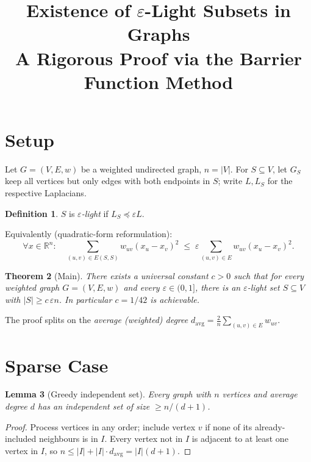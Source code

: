 \documentclass[12pt]{article}
\title{Existence of $\varepsilon$-Light Subsets in Graphs\\[4pt]
\large A Rigorous Proof via the Barrier Function Method}
\author{}
\date{}
\newtheorem{theorem}{Theorem}
\newtheorem{lemma}[theorem]{Lemma}
\theoremstyle{definition}
\newtheorem{definition}[theorem]{Definition}
\theoremstyle{remark}
\begin{document}
\maketitle

\section{Setup}

Let $G=(V,E,w)$ be a weighted undirected graph, $n=|V|$.
For $S\subseteq V$, let $G_S$ keep all vertices but only edges with both
endpoints in $S$; write $L,L_S$ for the respective Laplacians.

\begin{definition}
$S$ is \emph{$\varepsilon$-light} if $L_S\preceq\varepsilon L$.
\end{definition}

\noindent Equivalently (quadratic-form reformulation):
\[
  \forall x\in\mathbb{R}^n:\quad
  \sum_{(u,v)\in E(S,S)} w_{uv}(x_u-x_v)^2
  \;\le\;
  \varepsilon\sum_{(u,v)\in E}w_{uv}(x_u-x_v)^2.
\]

\begin{theorem}[Main]\label{thm:main}
There exists a universal constant $c>0$ such that for every weighted graph
$G=(V,E,w)$ and every $\varepsilon\in(0,1]$, there is an $\varepsilon$-light
set $S\subseteq V$ with $|S|\ge c\,\varepsilon n$.
In particular $c=1/42$ is achievable.
\end{theorem}

The proof splits on the \emph{average (weighted) degree}
$d_{\mathrm{avg}}=\frac{2}{n}\sum_{(u,v)\in E}w_{uv}$.

\section{Sparse Case}

\begin{lemma}[Greedy independent set]\label{lem:ind}
Every graph with $n$ vertices and average degree $d$ has an independent set
of size $\ge n/(d+1)$.
\end{lemma}

\begin{proof}
Process vertices in any order; include vertex $v$ if none of its
already-included neighbours is in $I$.  Every vertex not in $I$ is adjacent
to at least one vertex in $I$, so $n\le|I|+|I|\cdot d_{\mathrm{avg}}=|I|(d+1)$.
\end{proof}
\end{document}
